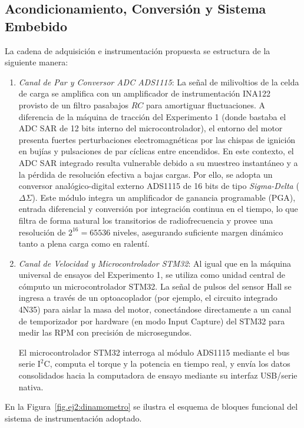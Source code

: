 \subsection{Acondicionamiento, Conversión y Sistema Embebido}
La cadena de adquisición e instrumentación propuesta se estructura de la siguiente manera:
\begin{enumerate}
    \item \emph{Canal de Par y Conversor ADC ADS1115}: La señal de milivoltios de la celda de carga se amplifica con un
    amplificador de instrumentación INA122 provisto de un filtro pasabajos $RC$ para amortiguar fluctuaciones.
    A diferencia de la máquina de tracción del Experimento 1 (donde bastaba el ADC SAR de 12 bits interno del microcontrolador),
    el entorno del motor presenta fuertes perturbaciones electromagnéticas por las chispas de ignición en bujías y pulsaciones
    de par cíclicas entre encendidos. En este contexto, el ADC SAR integrado resulta vulnerable debido a su muestreo instantáneo
    y a la pérdida de resolución efectiva a bajas cargas.
    Por ello, se adopta un conversor analógico-digital externo ADS1115 de 16 bits de tipo \emph{Sigma-Delta}
    ($\Delta\Sigma$). Este módulo integra un amplificador de ganancia programable (PGA), entrada diferencial y conversión por
    integración continua en el tiempo, lo que filtra de forma natural los transitorios de radiofrecuencia y provee una
    resolución de $2^{16} = 65536$ niveles, asegurando suficiente margen dinámico tanto a plena carga como en ralentí.

    \item \emph{Canal de Velocidad y Microcontrolador STM32}: Al igual que en la máquina universal de ensayos del Experimento 1,
    se utiliza como unidad central de cómputo un microcontrolador STM32. La señal de pulsos del sensor Hall se ingresa
        a través de un optoacoplador (por ejemplo, el circuito integrado 4N35)  para aislar la masa del motor, conectándose directamente a un canal
        de temporizador por hardware (en modo Input Capture) del STM32 para medir las RPM con precisión de microsegundos.
    
    El microcontrolador STM32 interroga al módulo ADS1115 mediante el bus serie $\text{I}^2\text{C}$, computa el torque y la potencia
    en tiempo real, y envía los datos consolidados hacia la computadora de ensayo mediante su interfaz USB/serie nativa.
\end{enumerate}

En la Figura~\ref{fig.ej2:dinamometro} se ilustra el esquema de bloques funcional del sistema de instrumentación adoptado.

